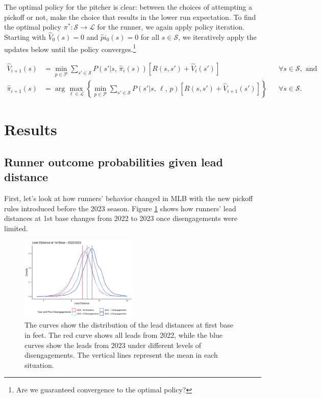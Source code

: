 \documentclass{article}
\begin{document}
        The optimal policy for the pitcher is clear: between the choices of attempting a pickoff or not, make the choice that results in the lower run expectation. To find the optimal policy $\pi^* : \mathcal{S} \rightarrow \mathcal{L}$ for the runner, we again apply policy iteration. Starting with $\hat V_0(s) = 0$ and $\hat pi_0(s) = 0$ for all $s \in \mathcal{S}$, we iteratively apply the updates below until the policy converges.\footnote{Are we guaranteed convergence to the optimal policy?}
        
        \begin{align}
          \label{eqn:update-value-two-agent}
          \hat V_{i+1}(s) &= \min_{p \in \mathcal{P}} \sum_{s' \in \mathcal{S}} P(s' | s,\, \hat\pi_i(s)) [R(s, s') + \hat V_i(s')] && \forall s \in \mathcal{S}, \mbox{ and}\\
          \label{eqn:update-policy-two-agent}
          \hat\pi_{i+1}(s) &= \arg\max_{\ell \in \mathcal{L}} \left\{\min_{p \in \mathcal{P}}\sum_{s' \in \mathcal{S}} P(s' | s,\, \ell,\, p) [R(s, s') + \hat V_{i+1}(s')]\right\} && \forall s \in \mathcal{S}.
        \end{align}

  \section{Results}
  
    \subsection{Runner outcome probabilities given lead distance}

    First, let's look at how runners' behavior changed in MLB with the new pickoff rules introduced before the 2023 season. Figure \ref{fig:leads-overall} shows how runners' lead distances at 1st base changes from 2022 to 2023 once disengagements were limited.

    \begin{figure}[b]
      \centering
      \includegraphics[width = 0.5\textwidth]{figures/leads_overall.png}
      \caption{The curves show the distribution of the lead distances at first base in feet. The red curve shows all leads from 2022, while the blue curves show the leads from 2023 under different levels of disengagements. The vertical lines represent the mean in each situation.}
      \label{fig:leads-overall}
    \end{figure}
\end{document}
